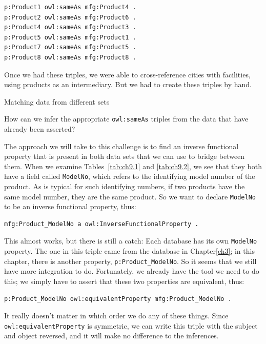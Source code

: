 \begin{lstlisting}
p:Product1 owl:sameAs mfg:Product4 .
p:Product2 owl:sameAs mfg:Product6 .
p:Product4 owl:sameAs mfg:Product3 .
p:Product5 owl:sameAs mfg:Product1 .
p:Product7 owl:sameAs mfg:Product5 .
p:Product8 owl:sameAs mfg:Product8 .
\end{lstlisting}

Once we had these triples, we were able to cross-reference cities with
facilities, using products as an intermediary. But we had to create
these triples by hand.

\begin{challenge}{Matching data from different sets}

How can we infer the appropriate \texttt{owl:sameAs} triples from the data that
have already been asserted?

\solution

The approach we will take to this challenge is to find an inverse
functional property that is present in both data sets that we can use to
bridge between them. When we examine Tables~\ref{tab:ch9.1} and \ref{tab:ch9.2}, we see that
they both have a field called \texttt{ModelNo}, which refers to the identifying
model number of the product. As is typical for such identifying numbers,
if two products have the same model number, they are the same product.
So we want to declare \texttt{ModelNo} to be an inverse functional property,
thus:

\begin{lstlisting}
mfg:Product_ModelNo a owl:InverseFunctionalProperty .
\end{lstlisting}

This almost works, but there is still a catch: Each database has its own
\texttt{ModelNo} property. The one in this triple came from the database in
Chapter\ref{ch3}; in this chapter, there is another property,
\texttt{p:Product\_ModelNo}. So it seems that we still have more integration to
do. Fortunately, we already have the tool we need to do this; we simply
have to assert that these two properties are equivalent, thus:

\begin{lstlisting}
p:Product_ModelNo owl:equivalentProperty mfg:Product_ModelNo .
\end{lstlisting}

It really doesn't matter in which order we do any of these things. Since
\texttt{owl:equivalentProperty} is symmetric, we can write this triple with the
subject and object reversed, and it will make no difference to the
inferences.


\end{challenge}
